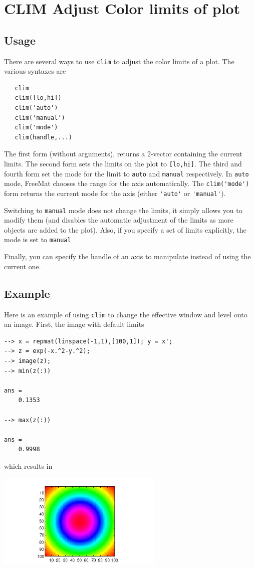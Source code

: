 \section{CLIM Adjust Color limits of plot}

\subsection{Usage}

There are several ways to use \verb|clim| to adjust the color limits of
a plot.  The various syntaxes are
\begin{verbatim}
   clim
   clim([lo,hi])   
   clim('auto')
   clim('manual')
   clim('mode')
   clim(handle,...)
\end{verbatim}
The first form (without arguments), returns a 2-vector containing the
current limits.  The second form sets the limits on the plot to \verb|[lo,hi]|.
The third and fourth form set the mode for the limit to \verb|auto| and \verb|manual|
respectively.  In \verb|auto| mode, FreeMat chooses the range for the axis 
automatically.  The \verb|clim('mode')| form returns the current mode for the axis
(either \verb|'auto'| or \verb|'manual'|).  

Switching to \verb|manual| mode does not change the limits, it simply allows
 you to modify them (and disables the automatic adjustment of the limits
as more objects are added to the plot).  Also, if you specify a set of 
limits explicitly, the mode is set to \verb|manual|
 
Finally, you can specify the handle of an
axis to manipulate instead of using the current one.
\subsection{Example}

Here is an example of using \verb|clim| to change the effective window and
level onto an image.  First, the image with default
limits
\begin{verbatim}
--> x = repmat(linspace(-1,1),[100,1]); y = x';
--> z = exp(-x.^2-y.^2);
--> image(z);
--> min(z(:))

ans = 
    0.1353 

--> max(z(:))

ans = 
    0.9998 
\end{verbatim}
which results in


\centerline{\includegraphics[width=8cm]{clim1}}

